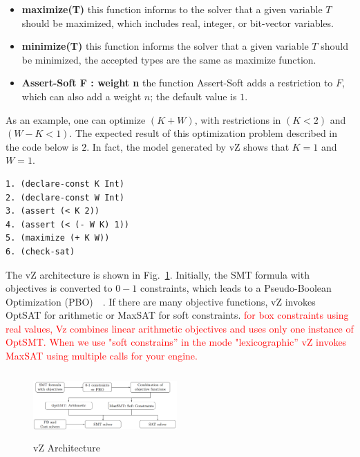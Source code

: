 \begin{itemize}
\item{\textbf{maximize(T)}
this function informs to the solver that a given variable $T$ should be maximized, which includes real, integer, or bit-vector variables.}
\item{\textbf{minimize(T)}
this function informs the solver that a given variable $T$ should be minimized, the accepted types are the same as maximize function.}
\item{\textbf{Assert-Soft F : weight n}
the function Assert-Soft adds a restriction to $F$, which can also add a weight $n$; the default value is $1$.}
\end{itemize}

As an example, one can optimize $\left(K + W\right)$, with restrictions in $\left(K < 2\right)$ and $\left(W - K < 1\right)$. The expected result of this optimization problem described in the code below is $2$. In fact, the model generated by vZ shows that $K = 1$ and $W = 1$.

\begin{lstlisting}[caption=SMT formula using vZ, label=vZ]
1. (declare-const K Int) 
2. (declare-const W Int)
3. (assert (< K 2)) 
4. (assert (< (- W K) 1))
5. (maximize (+ K W)) 
6. (check-sat)
\end{lstlisting}

The vZ architecture is shown in Fig.~\ref{vZ-Architecture}. Initially, the SMT formula with objectives is converted to $0-1$ constraints, which leads to a Pseudo-Boolean Optimization (PBO)\textcolor{red}{~\cite{Vasco2005}~\cite{Barth1995}}. If there are many objective functions, vZ invokes OptSAT for arithmetic or MaxSAT for soft constraints. \textcolor{red}{for box constraints using real values, Vz combines linear arithmetic objectives and uses only one instance of OptSMT. When we use "soft constrains'' in the mode "lexicographic'' vZ invokes MaxSAT using multiple calls for your engine.} 
%
\begin{figure}[ht]
	\centering
  \includegraphics[width=0.49\textwidth, height=95px]{Image/vzArch.png} 
	\caption{vZ Architecture~\cite{Bjorner2015}}
	\label{vZ-Architecture}
\end{figure}

